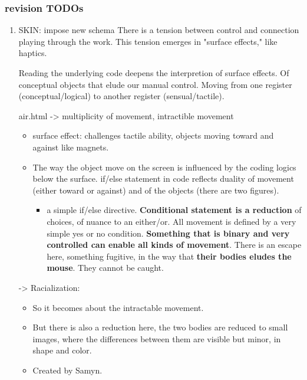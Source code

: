 \documentclass[11pt]{article}
\begin{document}
\subsubsection{revision TODOs}
\label{sec:org9c19e95}
\begin{enumerate}
\item SKIN: impose new schema
\label{sec:org934709f}
There is a tension between control and connection playing through the
work. This tension emerges in "surface effects," like haptics. 

Reading the underlying code deepens the interpretion of surface
effects. Of conceptual objects that elude our manual control. Moving
from one register (conceptual/logical) to another register
(sensual/tactile).

air.html -> multiplicity of movement, intractible movement
\begin{itemize}
\item surface effect: challenges tactile ability, objects moving toward
and against like magnets.
\item The way the object move on the screen is influenced by the coding
logics below the surface. if/else statement in code reflects duality
of movement (either toward or against) and of the objects (there are
two figures).
\begin{itemize}
\item a simple if/else directive. \textbf{Conditional statement is a reduction}
of choices, of nuance to an either/or. All movement is defined by
a very simple yes or no condition. \textbf{Something that is binary and
very controlled can enable all kinds of movement}. There is an
escape here, something fugitive, in the way that \textbf{their bodies
eludes the mouse}. They cannot be caught.
\end{itemize}
\end{itemize}
-> Racialization: 
\begin{itemize}
\item So it becomes about the intractable movement.
\item But there is also a reduction here, the two bodies are reduced to
small images, where the differences between them are visible but
minor, in shape and color.
\item Created by Samyn.
\end{itemize}


\end{enumerate}
\end{document}
